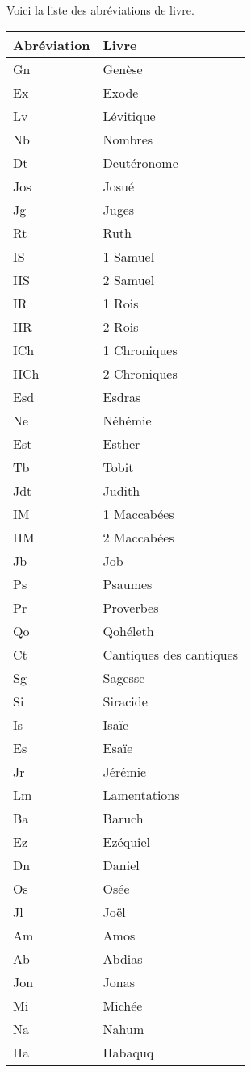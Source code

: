 Voici la liste des abréviations de livre.

\begin{longtable}{|l|l|}
\hline
Abréviation & Livre \\
\hline
\endhead
\hline
\endfoot
Gn	&	Genèse\\
Ex	&	Exode\\
Lv	&	Lévitique\\
Nb	&	Nombres\\
Dt	&	Deutéronome\\
Jos	&	Josué\\
Jg	&	Juges\\
Rt	&	Ruth\\
IS	&	1 Samuel\\
IIS	&	2 Samuel\\
IR	&	1 Rois\\
IIR	&	2 Rois\\
ICh	&	1 Chroniques\\
IICh	&	2 Chroniques\\
Esd	&	Esdras\\
Ne	&	Néhémie\\
Est	&	Esther\\
Tb	&	Tobit\\
Jdt	&	Judith\\
IM	&	1 Maccabées\\
IIM	&	2 Maccabées\\
Jb	&	Job\\
Ps	&	Psaumes\\
Pr	&	Proverbes\\
Qo	&	Qohéleth\\
Ct	&	Cantiques des cantiques\\
Sg	&	Sagesse\\
Si	&	Siracide\\
Is	&	Isaïe\\
Es	&	Esaïe\\
Jr	&	Jérémie\\
Lm	&	Lamentations\\
Ba	&	Baruch\\
Ez	&	Ezéquiel\\
Dn	&	Daniel\\
Os	&	Osée\\
Jl	&	Joël\\
Am	&	Amos\\
Ab	&	Abdias\\
Jon	&	Jonas\\
Mi	&	Michée\\
Na	&	Nahum\\
Ha	&	Habaquq\\

\end{longtable}
